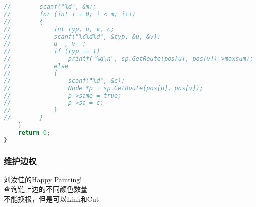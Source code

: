 \begin{lstlisting}[language=c++]
//        scanf("%d", &m);
//        for (int i = 0; i < m; i++)
//        {
//            int typ, u, v, c;
//            scanf("%d%d%d", &typ, &u, &v);
//            u--, v--;
//            if (typ == 1)
//                printf("%d\n", sp.GetRoute(pos[u], pos[v])->maxsum);
//            else
//            {
//                scanf("%d", &c);
//                Node *p = sp.GetRoute(pos[u], pos[v]);
//                p->same = true;
//                p->sa = c;
//            }
//        }
    }
    return 0;
}
        \end{lstlisting}
        
    \subsubsection{维护边权}
	刘汝佳的Happy Painting!\\
	查询链上边的不同颜色数量\\
	不能换根，但是可以Link和Cut\\
